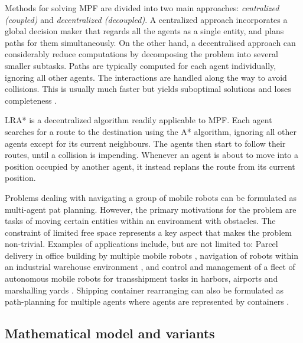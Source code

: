 Methods for solving MPF are divided into two main approaches: \emph{centralized (coupled)} and \emph{decentralized (decoupled)}.
A centralized approach incorporates a global decision maker that regards all the agents as a single entity, and plans paths for them simultaneously.
On the other hand, a decentralised approach can considerably reduce computations by decomposing the problem into several smaller subtasks.
Paths are typically computed for each agent individually, ignoring all other agents.
The interactions are handled along the way to avoid collisions.
This is usually much faster but yields suboptimal solutions and loses completeness \cite{ryan08}.

LRA* \cite{silver05} is a decentralized algorithm readily applicable to MPF.
Each  agent searches for a route to the destination using the A* algorithm, ignoring all other agents except for its current neighbours. 
The agents then start to follow their routes, until a collision is impending.  
Whenever an agent is about to move into a position occupied by another agent, it instead replans the route from its current position.

Problems dealing with navigating a group of mobile robots can be formulated as multi-agent pat planning.  
However, the primary motivations for the problem are tasks of moving certain entities within an environment with obstacles.
The constraint of limited free space represents a key aspect that makes the problem non-trivial. 
Examples of applications include, but are not limited to: 
Parcel delivery in office building by multiple mobile robots \cite{hada01},
navigation of robots within an industrial warehouse environment \cite{everett95},
and control and management of a fleet of autonomous mobile robots for transshipment tasks in harbors, airports and marshalling yards \cite{alami98}.
Shipping container rearranging can also be formulated as path-planning for multiple agents where agents are represented by containers \cite{surynek11}.

\subsection{Mathematical model and variants}\label{sect:modvar}

